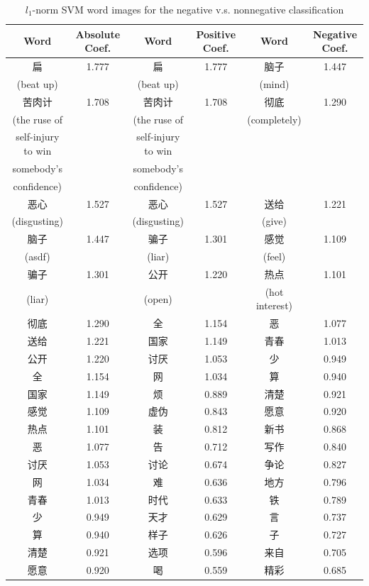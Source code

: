 \documentclass[11pt]{article}
\newcommand{\1}[1]{{\mathbf 1}\left\{#1\right\}}        %
\begin{document}
\begin{table}[!h]
\caption{$l_1$-norm SVM word images for the negative v.s. nonnegative classification}
\begin{center}
\begin{tabular}{|c|c||c|c||c|c|}
\hline
Word & Absolute Coef. & Word & Positive Coef. & Word & Negative Coef.\\ \hline  \hline
扁 & 1.777 & 扁 & 1.777 & 脑子 & 1.447\\
(beat up) & & (beat up) & & (mind) & \\\hline
苦肉计 & 1.708 & 苦肉计 & 1.708 & 彻底 & 1.290\\
(the ruse of  & & (the ruse of  &  &  (completely) &  \\
self-injury to win & &  self-injury to win &  & &  \\
somebody's & & somebody's  &  & &  \\
 confidence) & &  confidence)  &  & &  \\\hline
恶心 & 1.527 & 恶心 & 1.527 & 送给 & 1.221\\
(disgusting) & & (disgusting) & & (give) & \\\hline
脑子 & 1.447 & 骗子 & 1.301 & 感觉 & 1.109\\
(asdf) & & (liar) & & (feel) & \\\hline
骗子 & 1.301 & 公开 & 1.220 & 热点 & 1.101\\
(liar) & & (open) & & (hot interest) & \\\hline
彻底 & 1.290 & 全 & 1.154 & 恶 & 1.077\\ \hline
送给 & 1.221 & 国家 & 1.149 & 青春 & 1.013\\ \hline
公开 & 1.220 & 讨厌 & 1.053 & 少 & 0.949\\ \hline
全 & 1.154 & 网 & 1.034 & 算 & 0.940\\ \hline
国家 & 1.149 & 烦 & 0.889 & 清楚 & 0.921\\ \hline
感觉 & 1.109 & 虚伪 & 0.843 & 愿意 & 0.920\\ \hline
热点 & 1.101 & 装 & 0.812 & 新书 & 0.868\\ \hline
恶 & 1.077 & 告 & 0.712 & 写作 & 0.840\\ \hline
讨厌 & 1.053 & 讨论 & 0.674 & 争论 & 0.827\\ \hline
网 & 1.034 & 难 & 0.636 & 地方 & 0.796\\ \hline
青春 & 1.013 & 时代 & 0.633 & 铁 & 0.789\\ \hline
少 & 0.949 & 天才 & 0.629 & 言 & 0.737\\ \hline
算 & 0.940 & 样子 & 0.626 & 子 & 0.727\\ \hline
清楚 & 0.921 & 选项 & 0.596 & 来自 & 0.705\\ \hline
愿意 & 0.920 & 喝 & 0.559 & 精彩 & 0.685\\ \hline
\end{tabular}
\label{tb:svmfullneg}
\end{center}
\end{table}
\end{document}
